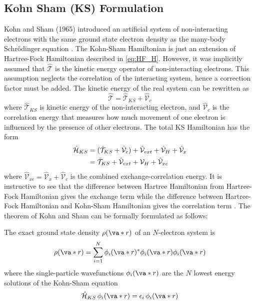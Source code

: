     \subsection{Kohn Sham (KS) Formulation}
    Kohn and Sham (1965) introduced an artificial system of non-interacting electrons with the same ground state electron density as the many-body Schr\"{o}dinger equation \citep{Kohn1965}. The Kohn-Sham Hamiltonian is just an extension of Hartree-Fock Hamiltonian described in \eqref{eq:HF_H}. However, it was implicitly assumed that $\hat{\mathcal{T}}$ is the  kinetic energy operator of non-interacting electrons. This assumption neglects the correlation of the interacting system, hence a correction factor must be added. The kinetic energy of the real system can be rewritten as 
    \begin{equation}
        \hat{\mathcal{T}} = \hat{\mathcal{T}}_{KS} +  \hat{\mathcal{V}}_c
    \end{equation}
    where $\hat{\mathcal{T}}_{KS}$ is kinetic energy of the non-interacting electron, and $\hat{\mathcal{V}}_c$ is the correlation energy that measures how much movement of one electron is influenced by the presence of other electrons. The total KS Hamiltonian has the form 
    \begin{align} \label{eq:HF_H}
        \hat{\mathcal{H}}_{KS}  &= (\hat{\mathcal{T}}_{KS} +  \hat{\mathcal{V}}_c)  + \hat{\mathcal{V}}_{ext} + \hat{\mathcal{V}}_H + \hat{\mathcal{V}}_x \notag \\
        &= \hat{\mathcal{T}}_{KS} + \hat{\mathcal{V}}_{ext} +{\mathcal{V}}_H + \hat{\mathcal{V}}_{xc}
    \end{align}
    where $\hat{\mathcal{V}}_{xc} = \hat{\mathcal{V}}_{x} + \hat{\mathcal{V}}_{c}$ is the combined exchange-correlation energy.  It is instructive to see that the difference between Hartree Hamiltonian from Hartree-Fock Hamiltonian gives the exchange term while the difference between Hartree-Fock Hamiltonian and Kohn-Sham Hamiltonian gives the correlation term \citep{Cottenier2002}. The theorem of Kohn and Sham can be formally formulated as follows:

    The exact ground state density $\rho({\va*{r}})$ of an $N$-electron system is 
\begin{equation}
\rho({\va*{r}}) = \sum_{i=1}^N \phi_i(\va*{r})^* \phi_i(\va*{r}) \phi_i(\va*{r}) 
\end{equation}
where the single-particle wavefunctions $\phi_i(\va*{r})$ are the $N$ lowest energy solutions of the Kohn-Sham equation
\begin{equation}
    \hat{\mathcal{H}}_{KS}\, \phi_i(\va*{r}) = \epsilon_i\, \phi_i(\va*{r})
\end{equation}
